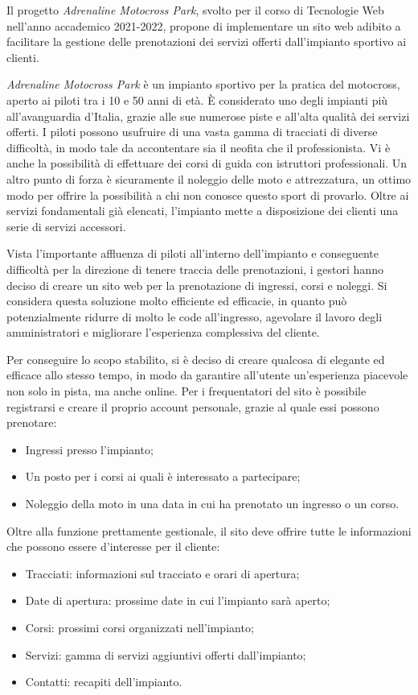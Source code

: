 Il progetto \textit{Adrenaline Motocross Park}, svolto per il corso di Tecnologie Web nell'anno accademico 2021-2022, propone di implementare un sito web adibito a facilitare la gestione delle prenotazioni dei servizi offerti dall'impianto sportivo ai clienti.

\textit{Adrenaline Motocross Park} è un impianto sportivo per la pratica del motocross, aperto ai piloti tra i 10 e 50 anni di età. È considerato uno degli impianti più all'avanguardia d'Italia, grazie alle sue numerose piste e all'alta qualità dei servizi offerti. I piloti possono usufruire di una vasta gamma di tracciati di diverse difficoltà, in modo tale da accontentare sia il neofita che il professionista. Vi è anche la possibilità di effettuare dei corsi di guida con istruttori professionali. Un altro punto di forza è sicuramente il noleggio delle moto e attrezzatura, un ottimo modo per offrire la possibilità a chi non conosce questo sport di provarlo. Oltre ai servizi fondamentali già elencati, l'impianto mette a disposizione dei clienti una serie di servizi accessori.

Vista l'importante affluenza di piloti all'interno dell'impianto e conseguente difficoltà per la direzione di tenere traccia delle prenotazioni, i gestori hanno deciso di creare un sito web per la prenotazione di ingressi, corsi e noleggi. Si considera questa soluzione molto efficiente ed efficacie, in quanto può potenzialmente ridurre di molto le code all'ingresso, agevolare il lavoro degli amministratori e migliorare l'esperienza complessiva del cliente.

Per conseguire lo scopo stabilito, si è deciso di creare qualcosa di elegante ed efficace allo stesso tempo, in modo da garantire all'utente un'esperienza piacevole non solo in pista, ma anche online. Per i frequentatori del sito è possibile registrarsi e creare il proprio account personale, grazie al quale essi possono prenotare:
\begin{itemize}
\item Ingressi presso l'impianto;
\item Un posto per i corsi ai quali è interessato a partecipare;
\item Noleggio della moto in una data in cui ha prenotato un ingresso o un corso.
\end{itemize}

Oltre alla funzione prettamente gestionale, il sito deve offrire tutte le informazioni che possono essere d'interesse per il cliente:
\begin{itemize}
\item Tracciati: informazioni sul tracciato e orari di apertura;
\item Date di apertura: prossime date in cui l'impianto sarà aperto;
\item Corsi: prossimi corsi organizzati nell'impianto;
\item Servizi: gamma di servizi aggiuntivi offerti dall'impianto;
\item Contatti: recapiti dell'impianto.
\end{itemize}